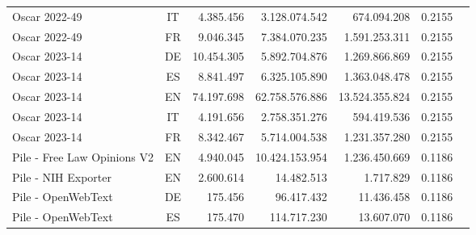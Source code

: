 \begin{table*}[tbh]
\begin{minipage}{0.9\textwidth}
\begin{tabular}{lcrrrrr}
\\
Oscar 2022-49 & IT %
& 4.385.456 & 3.128.074.542 %
& 674.094.208 & 0.2155
\\
Oscar 2022-49 & FR %
& 9.046.345 & 7.384.070.235 %
& 1.591.253.311 & 0.2155
\\
Oscar 2023-14 & DE %
& 10.454.305 & 5.892.704.876 %
& 1.269.866.869 & 0.2155
\\
Oscar 2023-14 & ES %
& 8.841.497 & 6.325.105.890 %
& 1.363.048.478 & 0.2155
\\
Oscar 2023-14 & EN %
& 74.197.698 & 62.758.576.886 %
& 13.524.355.824 & 0.2155
\\
Oscar 2023-14 & IT %
& 4.191.656 & 2.758.351.276 %
& 594.419.536 & 0.2155
\\
Oscar 2023-14 & FR %
& 8.342.467 & 5.714.004.538 %
& 1.231.357.280 & 0.2155
\\
\midrule
Pile - Free Law Opinions V2 & EN %
& 4.940.045 & 10.424.153.954 %
& 1.236.450.669 & 0.1186
\\
Pile - NIH Exporter & EN %
& 2.600.614 & 14.482.513 %
& 1.717.829 & 0.1186
\\
Pile - OpenWebText & DE %
& 175.456 & 96.417.432 %
& 11.436.458 & 0.1186
\\
Pile - OpenWebText  & ES %
& 175.470 & 114.717.230 %
& 13.607.070 & 0.1186

\end{tabular}
\end{minipage}
\end{table*}
